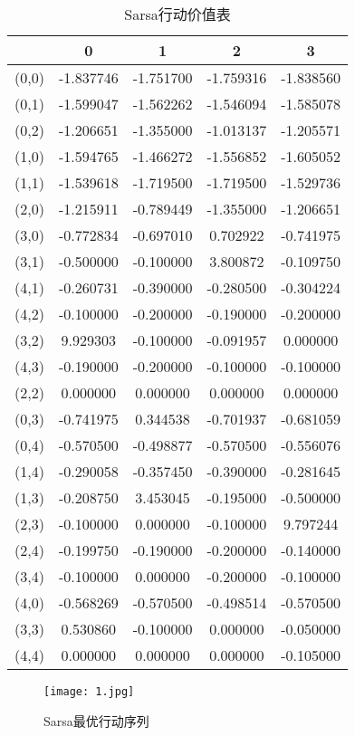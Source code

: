 \documentclass[lang=cn,a4paper]{elegantpaper}
\begin{document}
\begin{table}[htbp]
  \centering
  \caption{Sarsa行动价值表}
    \begin{tabular}{ccccc}
    \hline
                    &      0   &      1     &    2     &    3 \\
    \hline
    (0,0) & -1.837746& -1.751700& -1.759316& -1.838560 \\
     (0,1)& -1.599047& -1.562262& -1.546094& -1.585078 \\
     (0,2)& -1.206651& -1.355000& -1.013137& -1.205571 \\
     (1,0)& -1.594765& -1.466272& -1.556852& -1.605052 \\
     (1,1)& -1.539618& -1.719500& -1.719500& -1.529736 \\
     (2,0)& -1.215911& -0.789449& -1.355000& -1.206651 \\
     (3,0)& -0.772834& -0.697010&  0.702922& -0.741975 \\
     (3,1)& -0.500000& -0.100000&  3.800872& -0.109750 \\
     (4,1)& -0.260731& -0.390000& -0.280500& -0.304224 \\
     (4,2)& -0.100000& -0.200000& -0.190000& -0.200000 \\
    (3,2) &  9.929303& -0.100000& -0.091957&  0.000000 \\
     (4,3)& -0.190000& -0.200000& -0.100000& -0.100000 \\
     (2,2)&  0.000000&  0.000000&  0.000000&  0.000000 \\
     (0,3)& -0.741975&  0.344538& -0.701937& -0.681059 \\
     (0,4)& -0.570500& -0.498877& -0.570500& -0.556076 \\
     (1,4)& -0.290058& -0.357450& -0.390000& -0.281645 \\
     (1,3)& -0.208750&  3.453045& -0.195000& -0.500000 \\
     (2,3)& -0.100000&  0.000000& -0.100000&  9.797244 \\
     (2,4)& -0.199750& -0.190000& -0.200000& -0.140000 \\
     (3,4)& -0.100000&  0.000000& -0.200000& -0.100000 \\
     (4,0)& -0.568269& -0.570500& -0.498514& -0.570500 \\
     (3,3)&  0.530860& -0.100000&  0.000000& -0.050000 \\
     (4,4)&  0.000000&  0.000000&  0.000000& -0.105000 \\
     \hline
    \end{tabular}%
  \label{tab:addlabel}%
\end{table}%
\begin{figure}[H]
  \centering
  \texttt{[image: 1.jpg]}
  \caption{Sarsa最优行动序列} 
  \label{Fig.1}
\end{figure}
\end{document}
